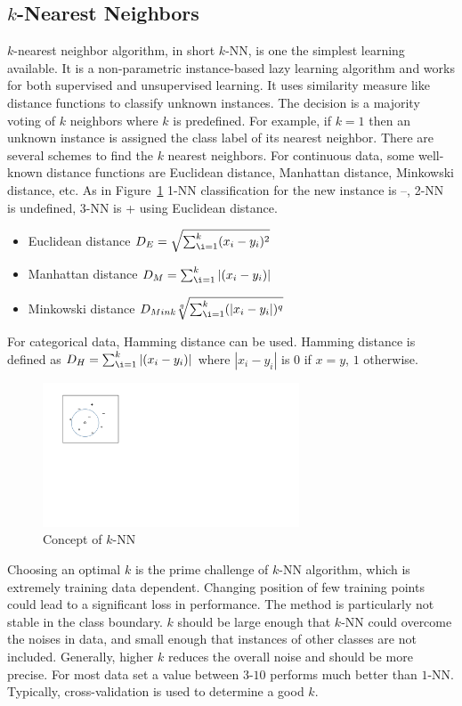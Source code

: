 \subsection*{$k$-Nearest Neighbors}
$k$-nearest neighbor algorithm, in short $k$-NN, is one the simplest learning available. It is a non-parametric instance-based lazy learning algorithm and works for both supervised and unsupervised learning. It uses similarity measure like distance functions to classify unknown instances. The decision is a majority voting of  $k$ neighbors where $k$ is predefined. For example, if $k= 1$ then an unknown instance is assigned the class label of its nearest neighbor. There are several schemes to find the $k$ nearest neighbors. For continuous data, some well-known distance functions are Euclidean distance, Manhattan distance, Minkowski distance, etc.  As in Figure~\ref{fig:bg:knn} 1-NN classification for the new instance is {--}, 2-NN is undefined, 3-NN is {+} using Euclidean distance.
\begin{itemize}
    \item Euclidean distance $D_E = \sqrt{\sum_{\i =1 }^{k} (x_i - y_i)^2}$
    \item Manhattan distance $D_M = \sum_{\i =1 }^{k} |(x_i - y_i)|$
    \item Minkowski distance $D_{Mink}\sqrt[q]{\sum_{\i =1 }^{k} (|x_i - y_i|)^q}$
\end{itemize}
For categorical data, Hamming distance can be used. Hamming distance is defined as $D_H = \sum_{\i =1 }^{k} |(x_i - y_i)|$ where $|x_i - y_i|$ is $0$ if $x=y$, $1$ otherwise.

\begin{figure}[htbp]
    \begin{center}
        \includegraphics[width=3.0in]{figs/knn.pdf}
        \caption{Concept of $k$-NN}
        \label{fig:bg:knn}
    \end{center}
\end{figure}

Choosing an optimal $k$ is the prime challenge of $k$-NN algorithm, which is extremely training data dependent. Changing position of few training points could lead to a significant loss in performance. The method is particularly not stable in the class boundary. $k$ should be large enough that $k$-NN could overcome the noises in data, and small enough that instances of other classes are not included. Generally, higher $k$ reduces the overall noise and should be more precise. For most data set a value between $3$-$10$ performs much better than $1$-NN. Typically, cross-validation is used to determine a good $k$. 


